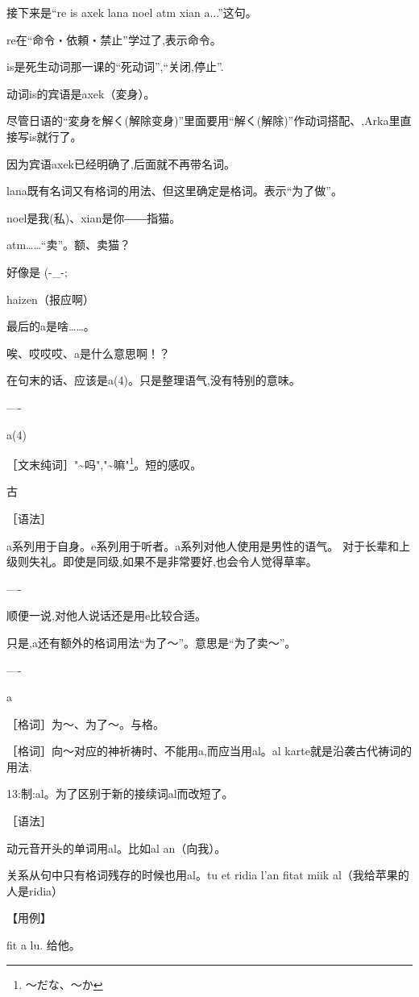 接下来是``re is axek lana noel atm xian a...''这句。

re在``命令・依頼・禁止''学过了,表示命令。

is是死生动词那一课的``死动词'',``关闭,停止''.


动词is的宾语是axek（変身）。

尽管日语的``変身を解く(解除变身)''里面要用``解く(解除)''作动词搭配、,Arka里直接写is就行了。

因为宾语axek已经明确了,后面就不再带名词。

lana既有名词又有格词的用法、但这里确定是格词。表示``为了做''。

noel是我(私)、xian是你――指猫。

atm……``卖''。额、卖猫？


好像是  (-\_{}-;

haizen（报应啊）


最后的a是啥……。

唉、哎哎哎、a是什么意思啊！？


在句末的话、应该是a(4)。只是整理语气,没有特别的意味。

----

a(4)

［文末纯词］"\~{}吗","\~{}嘛"\footnote{～だな、～か}。短的感叹。

古

［语法］

a系列用于自身。e系列用于听者。a系列对他人使用是男性的语气。
对于长辈和上级则失礼。即使是同级,如果不是非常要好,也会令人觉得草率。

----

顺便一说,对他人说话还是用e比较合适。

只是,a还有额外的格词用法``为了～''。意思是``为了卖～''。

----

a

［格词］为～、为了～。与格。

［格词］向～对应的神祈祷时、不能用a,而应当用al。al karte就是沿袭古代祷词的用法.

13:制:al。为了区别于新的接续词al而改短了。

［语法］

动元音开头的单词用al。比如al an（向我）。

关系从句中只有格词残存的时候也用al。tu et ridia l'an fitat miik al（我给苹果的人是ridia）

【用例】

fit a lu. 给他。

